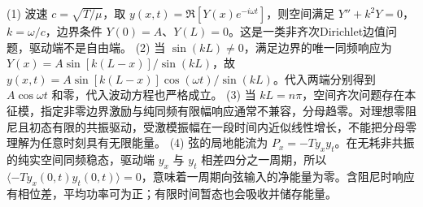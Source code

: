 (1) 波速 \(c=\sqrt{T/\mu}\)，取 \(y(x,t)=\Re[Y(x)e^{-i\omega t}]\)，则空间满足 \(Y''+k^2Y=0\)，\(k=\omega/c\)，边界条件 \(Y(0)=A\)、\(Y(L)=0\)。这是一类非齐次Dirichlet边值问题，驱动端不是自由端。
(2) 当 \(\sin(kL)\ne0\)，满足边界的唯一同频响应为 \(Y(x)=A\sin[k(L-x)]/\sin(kL)\)，故 \(y(x,t)=A\sin[k(L-x)]\cos(\omega t)/\sin(kL)\)。代入两端分别得到 \(A\cos\omega t\) 和零，代入波动方程也严格成立。
(3) 当 \(kL=n\pi\)，空间齐次问题存在本征模，指定非零边界激励与纯同频有限幅响应通常不兼容，分母趋零。对理想零阻尼且初态有限的共振驱动，受激模振幅在一段时间内近似线性增长，不能把分母零理解为任意时刻具有无限能量。
(4) 弦的局地能流为 \(P_x=-T y_x y_t\)。在无耗非共振的纯实空间同频稳态，驱动端 \(y_x\) 与 \(y_t\) 相差四分之一周期，所以 \(\langle -T y_x(0,t)y_t(0,t)\rangle=0\)，意味着一周期向弦输入的净能量为零。含阻尼时响应有相位差，平均功率可为正；有限时间暂态也会吸收并储存能量。
